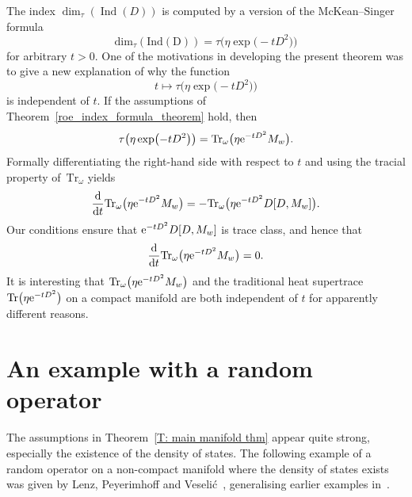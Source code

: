 \documentclass[pdftex]{sigma}
\numberwithin{equation}{section}
\begin{document}
\begin{Remark}
The index $\dim_{\tau}(\operatorname{Ind}(D))$ is computed by a version of the McKean--Singer formula~\cite[Proposition 8.1]{Roe1988a}
\[
 \mathrm{dim}_{\tau}(\mathrm{Ind}(\mathrm{D})) = \tau\big(\eta \exp\bigl(-tD^2\bigr)\big)
\]
for arbitrary $t>0.$ One of the motivations in developing the present theorem was
to give a new explanation of why the function
\[
 t\mapsto\tau\big(\eta\exp\bigl(-tD^2\bigr)\big)
\]
is independent of $t.$ If the assumptions of Theorem~\ref{roe_index_formula_theorem} hold, then
\[
 \tau\big(\eta \exp\bigl(-tD^2\bigr)\big) = \mathrm{Tr}_\omega\big(\eta {\rm e}^{-tD^2}M_w\big).
\]
Formally differentiating the right-hand side with respect to $t$ and using the tracial property of~$\mathrm{Tr}_\omega$ yields
\[
 \frac{{\rm d}}{{\rm d}t}\mathrm{Tr}_\omega\big(\eta {\rm e}^{-tD^2}M_w\big) = -\mathrm{Tr}_{\omega}\big(\eta {\rm e}^{-tD^2}D[D,M_w]\big).
\]
Our conditions ensure that ${\rm e}^{-tD^2}D[D,M_w]$ is trace class, and hence that
\[
 \frac{{\rm d}}{{\rm d}t}\mathrm{Tr}_{\omega}\big(\eta {\rm e}^{-tD^2}M_w\big) = 0.
\]
It is interesting that $\mathrm{Tr}_{\omega}\big(\eta {\rm e}^{-tD^2}M_w\big)$ and the traditional heat supertrace $\mathrm{Tr}\big(\eta {\rm e}^{-tD^2}\big)$ on a compact manifold are both independent of $t$ for apparently different reasons.
\end{Remark}


\section{An example with a random operator}\label{S: Example}
The assumptions in Theorem~\ref{T: main manifold thm} appear quite strong, especially the existence of the density of states. The following example of a random operator on a non-compact manifold where the density of states exists was given by Lenz, Peyerimhoff and Veseli\'{c}~\cite{LenzPeyerimhoffVeselic2007}, generalising earlier examples in~\cite{LenzPeyerimhoff2004,PeyerimhoffVeselic2002}.
\end{document}
